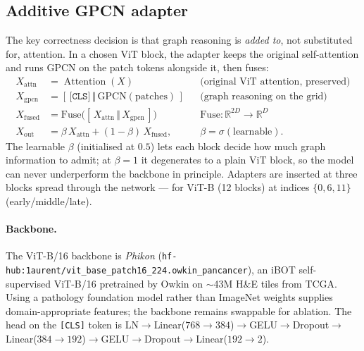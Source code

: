 \documentclass[11pt]{article}
\newcommand{\cls}{\texttt{[CLS]}}
\DeclareMathOperator{\Attn}{Attention}
\begin{document}
\subsection{Additive GPCN adapter}
\label{sec:adapter}
The key correctness decision is that graph reasoning is \emph{added to}, not
substituted for, attention. In a chosen ViT block, the adapter keeps the original
self-attention and runs GPCN on the patch tokens alongside it, then fuses:
\begin{align}
X_{\text{attn}} &= \Attn(X) & &\text{(original ViT attention, preserved)}\\
X_{\text{gpcn}} &= [\,\cls\,\Vert\,\mathrm{GPCN}(\text{patches})\,] & &\text{(graph reasoning on the grid)}\\
X_{\text{fused}} &= \mathrm{Fuse}\big([\,X_{\text{attn}}\,\Vert\,X_{\text{gpcn}}\,]\big) & &\mathrm{Fuse}:\mathbb{R}^{2D}\!\to\!\mathbb{R}^{D}\\
X_{\text{out}} &= \beta\,X_{\text{attn}} + (1-\beta)\,X_{\text{fused}}, & &\beta=\sigma(\text{learnable}).
\label{eq:adapter}
\end{align}
The learnable $\beta$ (initialised at $0.5$) lets each block decide how much graph
information to admit; at $\beta=1$ it degenerates to a plain ViT block, so the
model can never underperform the backbone in principle. Adapters are inserted at
three blocks spread through the network — for ViT-B (12 blocks) at indices
$\{0,6,11\}$ (early/middle/late).

\paragraph{Backbone.} The ViT-B/16 backbone is \emph{Phikon}
(\texttt{hf-hub:1aurent/vit\_base\_patch16\_224.owkin\_pancancer}), an iBOT
self-supervised ViT-B/16 pretrained by Owkin on $\sim$43M H\&E tiles from TCGA.
Using a pathology foundation model rather than ImageNet weights supplies
domain-appropriate features; the backbone remains swappable for ablation. The
head on the \cls{} token is
LN$\to$Linear($768{\to}384$)$\to$GELU$\to$Dropout$\to$Linear($384{\to}192$)$\to$GELU$\to$Dropout$\to$Linear($192{\to}2$).
\end{document}
